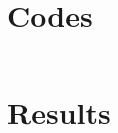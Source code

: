 \documentclass[a4paper, 11pt]{article}
\begin{document}
\section{Codes}
\begin{lstlisting}

\end{lstlisting}


\section{Results}
\begin{figure}
\centering
\end{figure}


%
%
\end{document}

